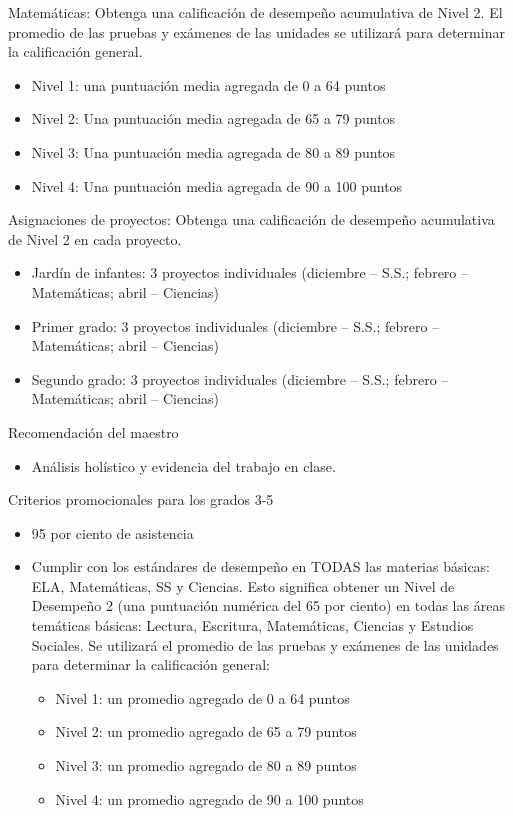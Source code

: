 \documentclass[12pt,letterpaper]{article}
\begin{document}
Matemáticas: Obtenga una calificación de desempeño acumulativa de Nivel 2. El promedio de las pruebas y exámenes de las unidades se utilizará para determinar la calificación general.
\begin{itemize}
\item Nivel 1: una puntuación media agregada de 0 a 64 puntos
\item Nivel 2: Una puntuación media agregada de 65 a 79 puntos
\item Nivel 3: Una puntuación media agregada de 80 a 89 puntos
\item Nivel 4: Una puntuación media agregada de 90 a 100 puntos
\end{itemize}
\pagebreak
\pagebreak
\vspace*{1.5cm}
Asignaciones de proyectos: Obtenga una calificación de desempeño acumulativa de Nivel 2 en cada proyecto.
\begin{itemize}
\item Jardín de infantes: 3 proyectos individuales (diciembre – S.S.; febrero – Matemáticas; abril – Ciencias)
\item Primer grado: 3 proyectos individuales (diciembre – S.S.; febrero – Matemáticas; abril – Ciencias)
\item Segundo grado: 3 proyectos individuales (diciembre – S.S.; febrero – Matemáticas; abril – Ciencias)
\end{itemize}

Recomendación del maestro
\begin{itemize}
\item Análisis holístico y evidencia del trabajo en clase.
\end{itemize}

Criterios promocionales para los grados 3-5
\begin{itemize}
\item 95 por ciento de asistencia
\item Cumplir con los estándares de desempeño en TODAS las materias básicas: ELA, Matemáticas, SS y Ciencias. Esto significa obtener un Nivel de Desempeño 2 (una puntuación numérica del 65 por ciento) en todas las áreas temáticas básicas: Lectura, Escritura, Matemáticas, Ciencias y Estudios Sociales. Se utilizará el promedio de las pruebas y exámenes de las unidades para determinar la calificación general:
	\begin{itemize}
	\item Nivel 1: un promedio agregado de 0 a 64 puntos
	\item Nivel 2: un promedio agregado de 65 a 79 puntos
	\item Nivel 3: un promedio agregado de 80 a 89 puntos
	\item Nivel 4: un promedio agregado de 90 a 100 puntos
	\end{itemize}
\end{itemize}
\end{document}
